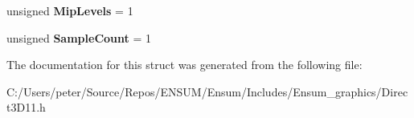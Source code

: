 \begin{DoxyCompactItemize}
\item 
unsigned {\bfseries Mip\+Levels} = 1\hypertarget{struct_ensum_1_1_graphics_1_1_depth_buffer_ad19eb78fd05249659dbbc5b980ca65a6}{}\label{struct_ensum_1_1_graphics_1_1_depth_buffer_ad19eb78fd05249659dbbc5b980ca65a6}

\item 
unsigned {\bfseries Sample\+Count} = 1\hypertarget{struct_ensum_1_1_graphics_1_1_depth_buffer_a790fb691f3e42bc0fdf1daeea85227ea}{}\label{struct_ensum_1_1_graphics_1_1_depth_buffer_a790fb691f3e42bc0fdf1daeea85227ea}

\end{DoxyCompactItemize}


The documentation for this struct was generated from the following file\+:\begin{DoxyCompactItemize}
\item 
C\+:/\+Users/peter/\+Source/\+Repos/\+E\+N\+S\+U\+M/\+Ensum/\+Includes/\+Ensum\+\_\+graphics/Direct3\+D11.\+h\end{DoxyCompactItemize}
